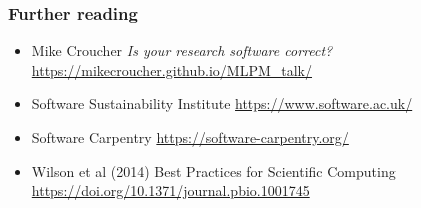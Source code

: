 \begin{frame}
  \frametitle{Further reading}
  \begin{itemize}

    \item Mike Croucher \emph{Is your research software correct?}
    \url{https://mikecroucher.github.io/MLPM_talk/}

    \item Software Sustainability Institute
    \url{https://www.software.ac.uk/}

    \item Software Carpentry
    \url{https://software-carpentry.org/}

    \item Wilson et al (2014) Best Practices for Scientific Computing
    \url{https://doi.org/10.1371/journal.pbio.1001745}

  \end{itemize}
\end{frame}


